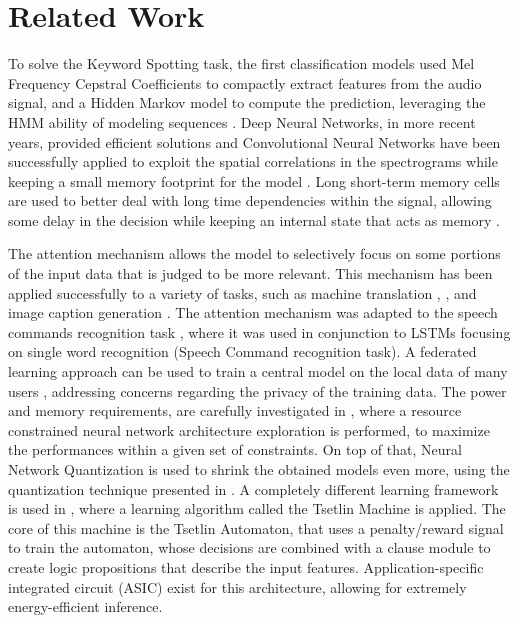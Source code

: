 
\section{Related Work}
\label{sec:related_work}

To solve the Keyword Spotting task, the first classification models used Mel
Frequency Cepstral Coefficients to compactly extract features from the audio
signal, and a Hidden Markov model to compute the prediction, leveraging the HMM
ability of modeling sequences \cite{mfcchmm103088}.
Deep Neural Networks, in more recent years, provided efficient solutions
\cite{chensmallDNN} and Convolutional Neural Networks have been successfully
applied to exploit the spatial correlations in the spectrograms while keeping a
small memory footprint for the model \cite{sainathconvolutional}.
Long short-term memory cells are used to better deal with long time
dependencies within the signal, allowing some delay in the decision while
keeping an internal state that acts as memory \cite{fernandezRNNKWS}.

The attention mechanism allows the model to selectively focus on some portions
of the input data that is judged to be more relevant.
This mechanism has been applied successfully to a variety of tasks, such as
machine translation \cite{luong2015effective}, \cite{bahdanau2016neural}, and
image caption generation \cite{xu2016show}.
The attention mechanism was adapted to the speech commands recognition task
\cite{2018arXiv180808929C}, where it was used in conjunction to LSTMs focusing
on single word recognition (Speech Command recognition task).
A federated learning approach can be used to train a central model on the local
data of many users \cite{leroy2019federated}, addressing concerns regarding the
privacy of the training data.
The power and memory requirements, are carefully investigated in
\cite{zhang2018hello}, where a resource constrained neural network architecture
exploration is performed, to maximize the performances within a given set of
constraints. On top of that, Neural Network Quantization is used to shrink the
obtained models even more, using the quantization technique presented in
\cite{10.1145/2847263.2847265}.
A completely different learning framework is used in \cite{granmo2021tsetlin},
where a learning algorithm called the Tsetlin Machine is applied.
The core of this machine is the Tsetlin Automaton,
that uses a penalty/reward signal to train the automaton, whose decisions are
combined with a clause module to create logic propositions that describe the 
input features.
Application-specific integrated circuit (ASIC) exist for this architecture,
allowing for extremely energy-efficient inference.
